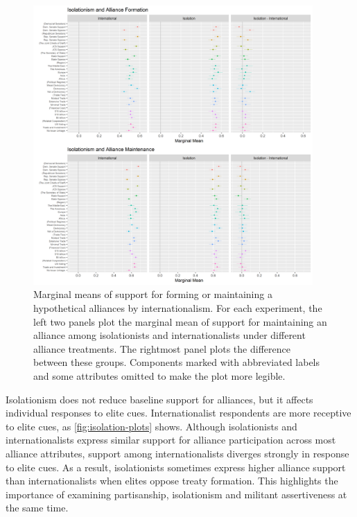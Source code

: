 \documentclass[12pt]{article}
\begin{document}
\begin{figure}
	\centering
		\includegraphics[width=0.95\textwidth]{isolation-plots.png}
	\caption{Marginal means of support for forming or maintaining a hypothetical alliances by internationalism. For each experiment, the left two panels plot the marginal mean of support for maintaining an alliance among isolationists and internationalists under different alliance treatments. The rightmost panel plots the difference between these groups. Components marked with abbreviated labels and some attributes omitted to make the plot more legible.}
	\label{fig:isolation-plots}
\end{figure}


Isolationism does not reduce baseline support for alliances, but it affects individual responses to elite cues. 
Internationalist respondents are more receptive to elite cues, as \autoref{fig:isolation-plots} shows. 
Although isolationists and internationalists express similar support for alliance participation across most alliance attributes, support among internationalists diverges strongly in response to elite cues. 
As a result, isolationists sometimes express higher alliance support than internationalists when elites oppose treaty formation. 
This highlights the importance of examining partisanship, isolationism and militant assertiveness at the same time. 
\end{document}
